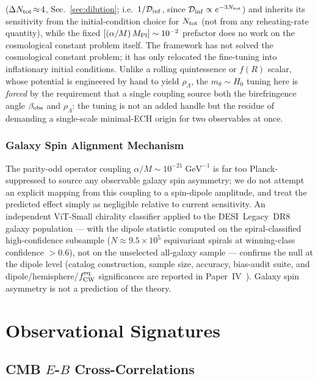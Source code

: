 \documentclass[aps,prd,twocolumn,superscriptaddress,showpacs,preprintnumbers,nofootinbib,longbibliography,floatfix]{revtex4-2}
\newcommand{\Dinf}{\mathcal{D}_{\rm inf}}
\newcommand{\MPl}{M_{\rm Pl}}
\newcommand{\fcw}{f_{\rm CW}}
\begin{document}
($\Delta N_{\rm tot}\!\approx\!4$, Sec.~\ref{sec:dilution}; i.e.\ $1/\Dinf$,
since $\Dinf\propto e^{-3 N_{\rm tot}}$) and inherits its sensitivity
from the initial-condition choice for $N_{\rm tot}$ (not from any
reheating-rate quantity), while the fixed
$[(\alpha/M)\,\MPl] \sim 10^{-2}$ prefactor does no work on the cosmological
constant problem itself. The framework has not solved the
cosmological constant problem; it has only relocated the fine-tuning into
inflationary initial conditions. Unlike a rolling quintessence or $f(R)$
scalar, whose potential is engineered by hand to yield $\rho_\Lambda$, the
$m_\theta\!\sim\!H_0$ tuning here is \emph{forced} by the requirement that a
single coupling source both the birefringence angle $\beta_{\rm obs}$ and
$\rho_\Lambda$: the tuning is not an added handle but the residue of demanding
a single-scale minimal-ECH origin for two observables at once.

\subsubsection{Galaxy Spin Alignment Mechanism}\label{sec:spinmech}

The parity-odd operator coupling $\alpha/M \sim 10^{-21}\;\text{GeV}^{-1}$
is far too Planck-suppressed to source any observable galaxy spin
asymmetry; we do not attempt an explicit mapping from this coupling to a
spin-dipole amplitude, and treat the predicted effect simply as negligible
relative to current sensitivity.
An independent ViT-Small chirality classifier applied to the DESI~Legacy~DR8
galaxy population --- with the dipole statistic computed on the
spiral-classified high-confidence subsample ($N\approx 9.5\times 10^{5}$
equivariant spirals at winning-class confidence $>0.6$), not on the
unselected all-galaxy sample --- confirms the null at the dipole level
(catalog construction,
sample size, accuracy, bias-audit suite, and dipole/hemisphere/$\fcw^{\rm eq}$
significances are reported in Paper~IV~\cite{Golden2026P4}). Galaxy spin
asymmetry is not a prediction of the theory.


\section{Observational Signatures}\label{sec:obs}

\subsection{CMB $E$-$B$ Cross-Correlations}\label{sec:EB}
\end{document}
